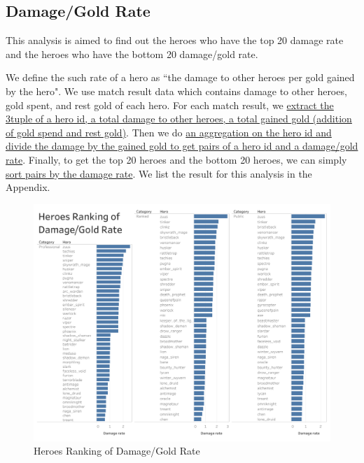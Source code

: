 \documentclass{article}
\begin{document}
\subsection{Damage/Gold Rate}

This analysis is aimed to find out the heroes who have the top 20 damage rate and the heroes who have the bottom 20 damage/gold rate.

We define the such rate of a hero as ``the damage to other heroes per gold gained by the hero". We use match result data which contains damage to other heroes, gold spent, and rest gold of each hero. For each match result, we \href{https://github.com/Vopaaz/big-data-psg-lgd/blob/master/src/main/scala/DamageRate.scala#L39-L41}{extract the 3tuple of a hero id, a total damage to other heroes, a total gained gold (addition of gold spend and rest gold)}. Then we do \href{https://github.com/Vopaaz/big-data-psg-lgd/blob/master/src/main/scala/DamageRate.scala#L42-L44}{an aggregation on the hero id and divide the damage by the gained gold to get pairs of a hero id and a damage/gold rate}. Finally, to get the top 20 heroes and the bottom 20 heroes, we can simply \href{https://github.com/Vopaaz/big-data-psg-lgd/blob/master/src/main/scala/DamageRate.scala#L47-L48}{sort pairs by the damage rate}. We list the result for this analysis in the Appendix.

\begin{figure}[H]
\centering
\includegraphics[width=\textwidth]{pic/DamageRate.png}
\caption{Heroes Ranking of Damage/Gold Rate}
\label{Heroes Ranking of Damage/Gold Rate}
\end{figure}
\end{document}
